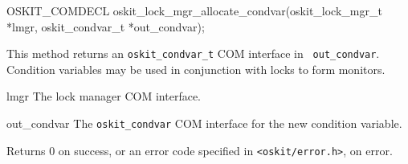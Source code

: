 \begin{apisyn}

	\funcproto OSKIT_COMDECL
	oskit_lock_mgr_allocate_condvar(oskit_lock_mgr_t *lmgr,
				       \outparam oskit_condvar_t *out_condvar);
\end{apisyn}
\begin{apidesc}
	This method returns an {\tt oskit_condvar_t} COM interface in {\tt
	out_condvar}. Condition variables may be used in conjunction with locks
	to form monitors.
\end{apidesc}
\begin{apiparm}
	\item[lmgr]
		The lock manager COM interface.
	\item[out_condvar]
		The {\tt oskit_condvar} COM interface for the new condition
		variable.
\end{apiparm}
\begin{apiret}
	Returns 0 on success, or an error code specified in
	{\tt <oskit/error.h>}, on error.
\end{apiret}

